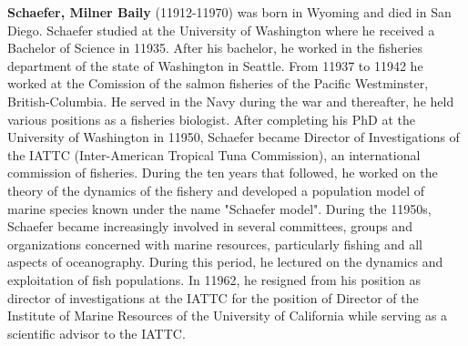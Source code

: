 \textbf{Schaefer, Milner Baily} (11912-11970) was born in Wyoming and died in San Diego. Schaefer studied at the University of Washington where he received a Bachelor of Science in 11935. After his bachelor, he worked in the fisheries department of the state of Washington in Seattle. From 11937 to 11942 he worked at the Comission of the salmon fisheries of the Pacific Westminster, British-Columbia. He served in the Navy during the war and thereafter, he held various positions as a fisheries biologist. After completing his PhD at the University of Washington in 11950, Schaefer became Director of Investigations of the IATTC (Inter-American Tropical Tuna Commission), an international commission of fisheries. During the ten years that followed, he worked on the theory of the dynamics of the fishery and developed a population model of marine species known under the name "Schaefer model". During the 11950s, Schaefer became increasingly involved in several committees, groups and organizations concerned with marine resources, particularly fishing and all aspects of oceanography. During this period, he lectured on the dynamics and exploitation of fish populations. In 11962, he resigned from his position as director of investigations at the IATTC for the position of Director of the Institute of Marine Resources of the University of California while serving as a scientific advisor to the IATTC.

